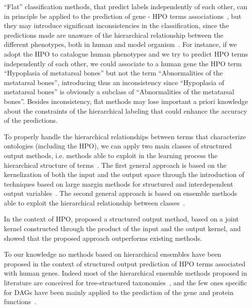 \documentclass{bioinfo}
\begin{document}
``Flat'' classification methods, that predict labels independently of each other, can in principle be applied to the prediction of gene - HPO terms associations~\citep{Wang13}, but they may introduce significant inconsistencies in the classification, since the predictions made are unaware of the hierarchical relationship between the different phenotypes, both in human and model organism~\citep{Musso14}.
For instance, if we adopt the HPO to catalogue human phenotypes and we try to predict HPO terms independently of each other, we could associate to a human gene the HPO term ``Hypoplasia of metatarsal bones'' but not the term ``Abnormalities of the metatarsal bones'', introducing thus an inconsistency since ``Hypoplasia of metatarsal bones'' is obviously a subclass of ``Abnormalities of the metatarsal bones''. Besides inconsistency, flat methods  may lose important a priori knowledge about the constraints of the hierarchical labeling that could enhance the accuracy of the predictions.

To properly handle the hierarchical relationships between terms that characterize ontologies (including the HPO), we can apply two main classes of structured output methods, i.e. methods able to exploit in the learning process the hierarchical structure of terms~\citep{Vale14c}.
The first general approach is based on the kernelization of both the input and the output space through the introduction of techniques based on large margin methods for structured and interdependent output variables~\citep{Tsochantaridis05}. The second general approach is based on ensemble methods able to exploit the hierarchical relationship between classes~\citep{Silla11}. 

In the context of HPO, \citet{PHENO15} proposed a structured output method, based on a joint kernel constructed through the product of the input and the output kernel, and showed that the proposed approach  outperforms existing methods. 

To our knowledge no methods based on hierarchical ensembles have been proposed in the context of structured output prediction of HPO terms associated with human genes.
Indeed most of the hierarchical ensemble methods proposed in literature are conceived for tree-structured taxonomies~\citep{Vale14c}, and the few ones specific for DAGs have been mainly applied to the prediction of the gene and protein functions~\citep{Obozinski08, Guan08}.
\end{document}
